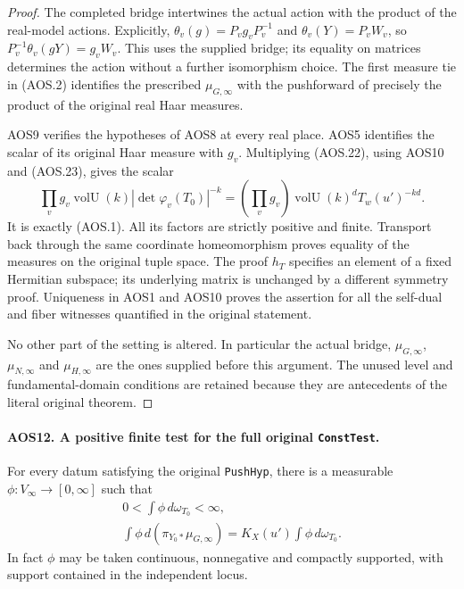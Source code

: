 \begin{proof}
The completed bridge intertwines the actual action with the product
of the real-model actions.  Explicitly,
$\theta_v(g)=P_vg_vP_v^{-1}$ and
$\theta_v(Y)=P_vW_v$, so
$P_v^{-1}\theta_v(gY)=g_vW_v$.  This uses the supplied bridge;
its equality on matrices determines the action without a further
isomorphism choice.  The first measure tie in (AOS.2) identifies
the prescribed $\mu_{G,\infty}$ with the pushforward of precisely
the product of the original real Haar measures.

AOS9 verifies the hypotheses of AOS8 at every real place.  AOS5
identifies the scalar of its original Haar measure with $g_v$.
Multiplying (AOS.22), using AOS10 and (AOS.23), gives the scalar
\[
       \prod_v g_v\operatorname{volU}(k)
                            |\det\varphi_v(T_0)|^{-k}
          =\left(\prod_vg_v\right)
               \operatorname{volU}(k)^dT_w(u')^{-kd}.
 \tag{AOS.27}
\]
It is exactly (AOS.1).  All its factors are strictly positive and
finite.  Transport back through the same coordinate homeomorphism
proves equality of the measures on the original tuple space.
The proof $h_T$ specifies an element of a fixed Hermitian subspace;
its underlying matrix is unchanged by a different symmetry proof.
Uniqueness in AOS1 and AOS10 proves the assertion for all the
self-dual and fiber witnesses quantified in the original statement.

No other part of the setting is altered.  In particular the actual
bridge, $\mu_{G,\infty}$, $\mu_{N,\infty}$ and
$\mu_{H,\infty}$ are the ones supplied before this argument.
The unused level and fundamental-domain conditions are retained
because they are antecedents of the literal original theorem.
\end{proof}

\paragraph{AOS12. A positive finite test for the full original \texttt{ConstTest}.}
\label{claim:AOS12}
For every datum satisfying the original \texttt{PushHyp}, there is a
measurable $\phi:V_\infty\to[0,\infty]$ such that
\[
 \begin{gathered}
             0<\int\phi\,d\omega_{T_0}<\infty,\\
 \int\phi\,d(\pi_{Y_0*}\mu_{G,\infty})
                  =K_X(u')\int\phi\,d\omega_{T_0}.
 \end{gathered}
 \tag{AOS.28}
\]
In fact $\phi$ may be taken continuous, nonnegative and compactly
supported, with support contained in the independent locus.

